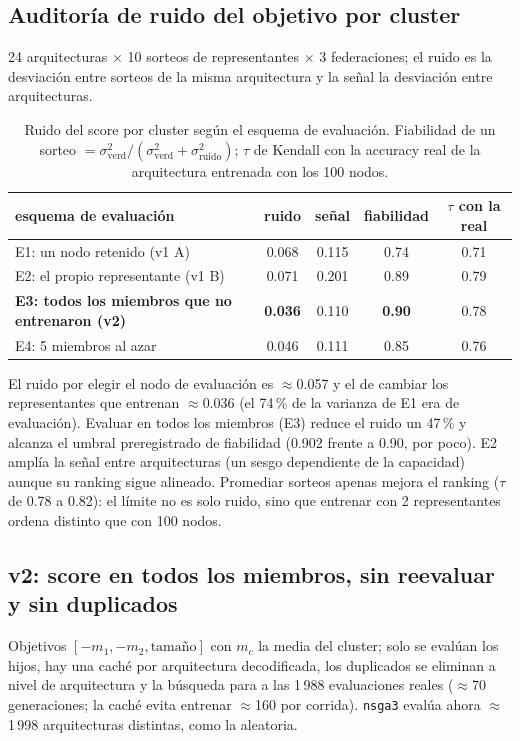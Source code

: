 \documentclass[11pt,a4paper]{article}
\begin{document}
\subsection*{Auditoría de ruido del objetivo por cluster}
24 arquitecturas $\times$ 10 sorteos de representantes $\times$ 3 federaciones; el ruido es la desviación entre sorteos de la misma arquitectura y la señal la desviación entre arquitecturas.
\begin{table}[h]
\centering\small
\begin{tabular}{lcccc}
\toprule
esquema de evaluación & ruido & señal & fiabilidad & $\tau$ con la real\\
\midrule
E1: un nodo retenido (v1 A) & 0.068 & 0.115 & 0.74 & 0.71\\
E2: el propio representante (v1 B) & 0.071 & 0.201 & 0.89 & 0.79\\
\textbf{E3: todos los miembros que no entrenaron (v2)} & \textbf{0.036} & 0.110 & \textbf{0.90} & 0.78\\
E4: 5 miembros al azar & 0.046 & 0.111 & 0.85 & 0.76\\
\bottomrule
\end{tabular}
\caption{Ruido del score por cluster según el esquema de evaluación. Fiabilidad de un sorteo $=\sigma^2_{\mathrm{verd}}/(\sigma^2_{\mathrm{verd}}+\sigma^2_{\mathrm{ruido}})$; $\tau$ de Kendall con la accuracy real de la arquitectura entrenada con los 100 nodos.}
\label{tab:audit}
\end{table}

El ruido por elegir el nodo de evaluación es $\approx$0.057 y el de cambiar los representantes que entrenan $\approx$0.036 (el 74\,\% de la varianza de E1 era de evaluación). Evaluar en todos los miembros (E3) reduce el ruido un 47\,\% y alcanza el umbral preregistrado de fiabilidad (0.902 frente a 0.90, por poco). E2 amplía la señal entre arquitecturas (un sesgo dependiente de la capacidad) aunque su ranking sigue alineado. Promediar sorteos apenas mejora el ranking ($\tau$ de 0.78 a 0.82): el límite no es solo ruido, sino que entrenar con 2 representantes ordena distinto que con 100 nodos.

\subsection*{v2: score en todos los miembros, sin reevaluar y sin duplicados}
Objetivos $[-m_1,-m_2,\text{tamaño}]$ con $m_c$ la media del cluster; solo se evalúan los hijos, hay una caché por arquitectura decodificada, los duplicados se eliminan a nivel de arquitectura y la búsqueda para a las 1\,988 evaluaciones reales ($\approx$70 generaciones; la caché evita entrenar $\approx$160 por corrida). \texttt{nsga3} evalúa ahora $\approx$1\,998 arquitecturas distintas, como la aleatoria.
\end{document}
